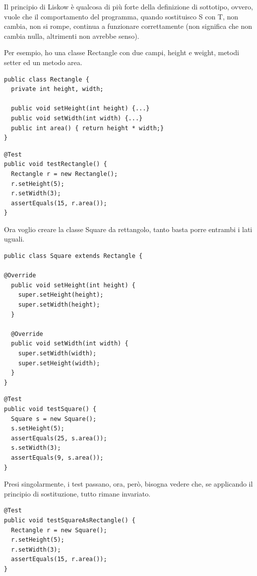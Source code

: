 Il principio di Liskow è qualcosa di più forte della definizione di sottotipo, ovvero, vuole che il comportamento del programma, quando sostituisco S con T, non 
cambia, non si rompe, continua a funzionare correttamente (non significa che non cambia nulla, altrimenti non avrebbe senso).

Per esempio, ho una classe Rectangle con due campi, height e weight, metodi setter ed un metodo area.
\begin{multicols}{2}
\begin{lstlisting}
public class Rectangle {
  private int height, width;

  public void setHeight(int height) {...}
  public void setWidth(int width) {...}
  public int area() { return height * width;}
}
\end{lstlisting}
\columnbreak
\begin{lstlisting}
@Test
public void testRectangle() {
  Rectangle r = new Rectangle();
  r.setHeight(5);
  r.setWidth(3);
  assertEquals(15, r.area());
}
\end{lstlisting}
\end{multicols}

Ora voglio creare la classe Square da rettangolo, tanto basta porre entrambi i lati uguali.
\begin{multicols}{2}
\begin{lstlisting}
public class Square extends Rectangle {
  
@Override
  public void setHeight(int height) {
    super.setHeight(height);
    super.setWidth(height);
  }

  @Override
  public void setWidth(int width) {
    super.setWidth(width);
    super.setHeight(width);
  }
}
\end{lstlisting}
\columnbreak
\begin{lstlisting}
@Test
public void testSquare() {
  Square s = new Square();
  s.setHeight(5);
  assertEquals(25, s.area());
  s.setWidth(3);
  assertEquals(9, s.area());
}
\end{lstlisting}
\end{multicols}  

Presi singolarmente, i test passano, ora, però, bisogna vedere che, se applicando il principio di sostituzione, tutto rimane invariato.
\begin{lstlisting}[linewidth=8cm]
@Test
public void testSquareAsRectangle() {
  Rectangle r = new Square();
  r.setHeight(5);
  r.setWidth(3);
  assertEquals(15, r.area());
}
\end{lstlisting}

